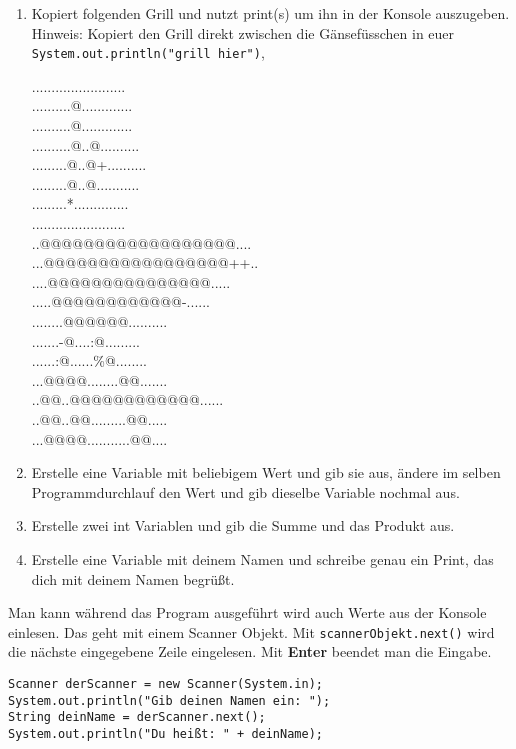 \documentclass{../../sheet}
\begin{document}
\begin{enumerate}
    \item Kopiert folgenden Grill und nutzt print(s) um ihn in der Konsole auszugeben.\\
    Hinweis: Kopiert den Grill direkt zwischen die Gänsefüsschen in euer \texttt{System.out.println("grill hier")},  
          \begin{ausgabe}
........................\\
..........@.............\\
..........@.............\\
..........@..@..........\\
.........@..@+..........\\
.........@..@...........\\
.........*..............\\
........................\\
..@@@@@@@@@@@@@@@@@@....\\
...@@@@@@@@@@@@@@@@@++..\\
....@@@@@@@@@@@@@@@.....\\
.....@@@@@@@@@@@@-......\\
........@@@@@@..........\\
.......-@....:@.........\\
......:@......\%@........\\
...@@@@........@@.......\\
..@@..@@@@@@@@@@@@......\\
..@@..@@.........@@.....\\
...@@@@...........@@....
          \end{ausgabe}
    \item Erstelle eine Variable mit beliebigem Wert und gib sie aus, ändere im selben Programmdurchlauf den Wert und gib dieselbe Variable nochmal aus.
    \item Erstelle zwei int Variablen und gib die Summe und das Produkt aus.
    \item Erstelle eine Variable mit deinem Namen und schreibe genau ein Print, das dich mit deinem Namen begrüßt.
\end{enumerate}

\newpage
{}
Man kann während das Program ausgeführt wird auch Werte aus der Konsole einlesen. Das geht mit einem Scanner Objekt. Mit \texttt{scannerObjekt.next()} wird die nächste eingegebene Zeile eingelesen. Mit \textbf{Enter} beendet man die Eingabe.
\begin{verbatim}
Scanner derScanner = new Scanner(System.in);
System.out.println("Gib deinen Namen ein: ");
String deinName = derScanner.next();
System.out.println("Du heißt: " + deinName);
\end{verbatim}
\end{document}
